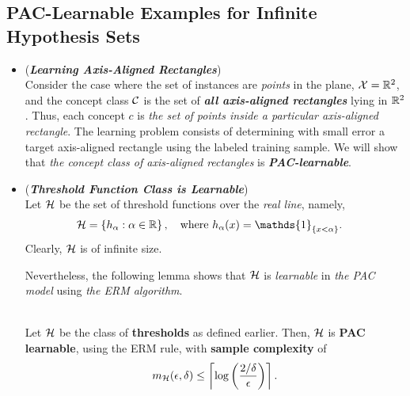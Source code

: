 \documentclass[11pt]{article}
\begin{document}
\subsection{PAC-Learnable Examples for Infinite Hypothesis Sets}
\begin{itemize}
\item \begin{example} (\emph{\textbf{Learning Axis-Aligned Rectangles}}) \citep{mohri2018foundations}\\
Consider the case where the set of instances are \emph{points} in the plane, ${\mathcal X} = {\mathbb R}^2$, and the concept class ${\mathcal C}$ is the set of \emph{\textbf{all axis-aligned rectangles}} lying in ${\mathbb R}^2$. Thus, each concept $c$ is \emph{the set of points inside a particular axis-aligned rectangle}. The learning
problem consists of determining with small error a target axis-aligned rectangle using the labeled training sample. We will show that \emph{the concept class of axis-aligned rectangles} is \emph{\textbf{PAC-learnable}}.
\end{example}



\item \begin{example} (\emph{\textbf{Threshold Function Class is Learnable}}) \citep{shalev2014understanding, mohri2018foundations}\\
Let ${\mathcal H}$ be the set of threshold functions over the \emph{real line}, namely,
\begin{align*}
\cH &= \set{h_{\alpha}: \alpha \in \bR}, \quad\text{where } h_{\alpha}(x) = \mathds{1}_{\set{x<\alpha}}.
\end{align*}
Clearly, ${\mathcal H}$ is of infinite size.

Nevertheless, the following lemma shows that ${\mathcal H}$ is \emph{learnable} in \emph{the PAC model} using \emph{the ERM algorithm}.

\begin{lemma}\citep{shalev2014understanding}\\
Let ${\mathcal H}$ be the class of \textbf{thresholds} as defined earlier. Then, ${\mathcal H}$ is \textbf{PAC learnable}, using the ERM rule, with \textbf{sample complexity} of
\begin{align*}
m_{{\mathcal H}}(\epsilon, \delta) \le \left\lceil \log\left(\frac{2/\delta}{\epsilon}\right) \right\rceil.
\end{align*}
\end{lemma}
\end{example}
\end{itemize}
\end{document}
